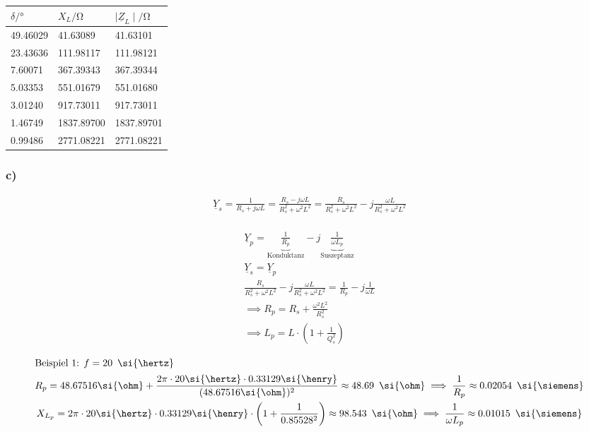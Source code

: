 \documentclass[a4paper, 12pt]{article}
\begin{document}
      \begin{table}[H]
      \begin{center}
      \begin{tabular}{@{}lll@{}}
      \toprule
      $\delta/\si{\degree}$  & $X_L/\si{\ohm}$   & $\mid \underline{Z}_L \mid /\si{\ohm}$ \\ \midrule
      49.46029 & 41.63089   & 41.63101         \\
      23.43636 & 111.98117  & 111.98121        \\
      7.60071  & 367.39343  & 367.39344        \\
      5.03353  & 551.01679  & 551.01680        \\
      3.01240  & 917.73011  & 917.73011        \\
      1.46749  & 1837.89700 & 1837.89701       \\
      0.99486  & 2771.08221 & 2771.08221       \\ \bottomrule
      \end{tabular}
      \end{center}
      \end{table}

      \subsubsection*{c)}

      \begin{gather*}
        \underline{Y}_s = \frac{1}{R_s + j \omega L} = \frac{R_s - j \omega L}{R_s^2 + \omega^2 L^2} = \frac{R_s}{R_s^2 + \omega^2 L^2} - j \frac{\omega L}{R_s^2 + \omega^2 L^2}\\
      \end{gather*}

      \begin{gather*}
        \underline{Y}_p = \underbrace{\frac{1}{R_p}}_{\text{Konduktanz}} - j \underbrace{\frac{1}{\omega L_p}}_{\text{Suszeptanz}}\\
        \underline{Y}_s = \underline{Y}_p\\
        \frac{R_s}{R_s^2 + \omega^2 L^2} - j \frac{\omega L}{R_s^2 + \omega^2 L^2} = \frac{1}{R_p} - j \frac{1}{\omega L}\\
        \implies R_p = R_s + \frac{\omega^2 L^2}{R_s^2}\\
        \implies L_p = L \cdot \left( 1 + \frac{1}{Q_s^2} \right)
      \end{gather*}

      \begin{gather*}
        \intertext{Beispiel 1: $f = 20 \,\ \si{\hertz}$}
        R_p = 48.67516 \si{\ohm} + \frac{2 \pi \cdot 20 \si{\hertz} \cdot 0.33129 \si{\henry}}{(48.67516 \si{\ohm})^2} \approx 48.69 \,\ \si{\ohm} \implies \frac{1}{R_p} \approx 0.02054 \,\ \si{\siemens}\\
        X_{L_{p}} = 2 \pi \cdot 20 \si{\hertz} \cdot 0.33129 \si{\henry} \cdot \left( 1+\frac{1}{0.85528^2}\right) \approx 98.543 \,\ \si{\ohm} \implies \frac{1}{\omega L_p} \approx 0.01015 \,\ \si{\siemens}
      \end{gather*}
\end{document}
